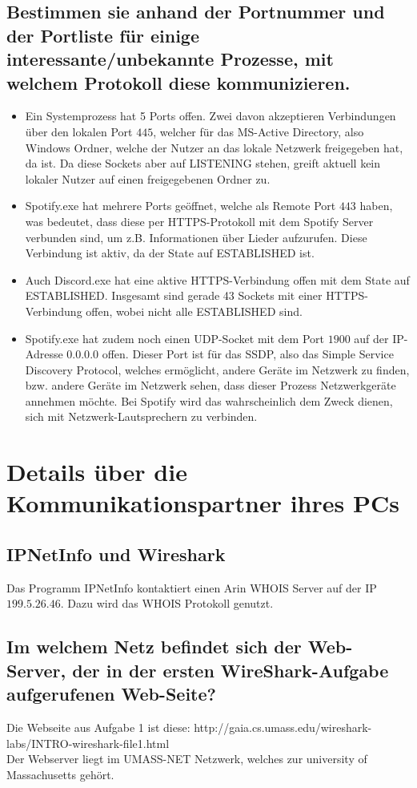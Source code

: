 \documentclass{kdiartcl}
\begin{document}
\subsection{Bestimmen sie anhand der Portnummer und der Portliste für einige interessante/unbekannte
Prozesse, mit welchem Protokoll diese kommunizieren. }
\begin{itemize}
    \item Ein Systemprozess hat 5 Ports offen. Zwei davon akzeptieren Verbindungen über den lokalen Port $445$, welcher für das MS-Active Directory, also Windows Ordner, welche der Nutzer an das lokale Netzwerk freigegeben hat, da ist. Da diese Sockets aber auf LISTENING stehen, greift aktuell kein lokaler Nutzer auf einen freigegebenen Ordner zu.
    \item Spotify.exe hat mehrere Ports geöffnet, welche als Remote Port $443$ haben, was bedeutet, dass diese per HTTPS-Protokoll mit dem Spotify Server verbunden sind, um z.B. Informationen über Lieder aufzurufen. Diese Verbindung ist aktiv, da der State auf ESTABLISHED ist.
    \item Auch Discord.exe hat eine aktive HTTPS-Verbindung offen mit dem State auf ESTABLISHED. Insgesamt sind gerade 43 Sockets mit einer HTTPS-Verbindung offen, wobei nicht alle ESTABLISHED sind.
    \item Spotify.exe hat zudem noch einen UDP-Socket mit dem Port $1900$ auf der IP-Adresse $0.0.0.0$ offen. Dieser Port ist für das SSDP, also das Simple Service Discovery Protocol, welches ermöglicht, andere Geräte im Netzwerk zu finden, bzw. andere Geräte im Netzwerk sehen, dass dieser Prozess Netzwerkgeräte annehmen möchte. Bei Spotify wird das wahrscheinlich dem Zweck dienen, sich mit Netzwerk-Lautsprechern zu verbinden.
\end{itemize}

\section{Details über die Kommunikationspartner ihres PCs}
\subsection{IPNetInfo und Wireshark}
Das Programm IPNetInfo kontaktiert einen Arin WHOIS Server auf der IP $199.5.26.46$. Dazu wird das WHOIS Protokoll genutzt.
\subsection{Im welchem Netz befindet sich der Web-Server, der in der ersten WireShark-Aufgabe aufgerufenen
Web-Seite?}
Die Webseite aus Aufgabe 1 ist diese: http://gaia.cs.umass.edu/wireshark-labs/INTRO-wireshark-file1.html \\
Der Webserver liegt im UMASS-NET Netzwerk, welches zur university of Massachusetts gehört.
\end{document}
